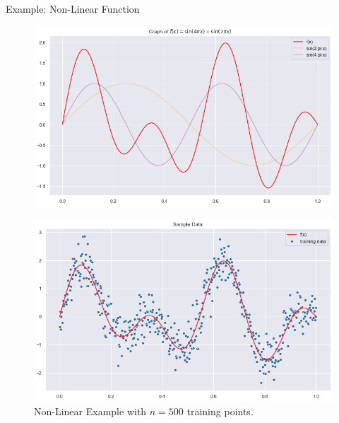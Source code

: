 \documentclass[10pt]{beamer}
\begin{document}
\begin{frame}{Example: Non-Linear Function}{\cite{gaussian_process_reg_2019}}
\begin{center}
\begin{figure}
\includegraphics[scale=0.23]{images/f_example2.png} 
\end{figure}
\end{center}
\begin{center}
\begin{figure}
\includegraphics[scale=0.23]{images/raw_data_example2.png} 
\caption{Non-Linear Example with $n=500$ training points.}
\end{figure}
\end{center}
\end{frame}
\end{document}
